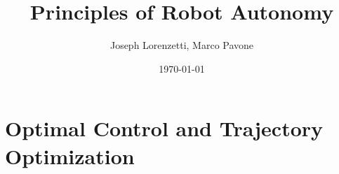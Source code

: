 \documentclass[nohyper,nobib]{tufte-book}
\title{Principles of Robot Autonomy}
\author{Joseph Lorenzetti, Marco Pavone}
\date{\today}
\begin{document}
\chapter{Optimal Control and Trajectory Optimization}


\printbibliography
\end{document}

